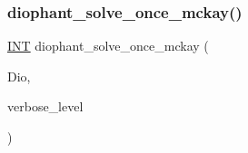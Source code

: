 \mbox{\label{incidence__global_8_c_a07850fda568ec16903a61d033baffd9d}} 
\subsubsection{\texorpdfstring{diophant\+\_\+solve\+\_\+once\+\_\+mckay()}{diophant\_solve\_once\_mckay()}}
{\footnotesize\ttfamily \mbox{\hyperlink{galois_8h_a09fddde158a3a20bd2dcadb609de11dc}{I\+NT}} diophant\+\_\+solve\+\_\+once\+\_\+mckay (\begin{DoxyParamCaption}\item[{\mbox{\hyperlink{classdiophant}{diophant}} $\ast$}]{Dio,  }\item[{\mbox{\hyperlink{galois_8h_a09fddde158a3a20bd2dcadb609de11dc}{I\+NT}}}]{verbose\+\_\+level }\end{DoxyParamCaption})}

